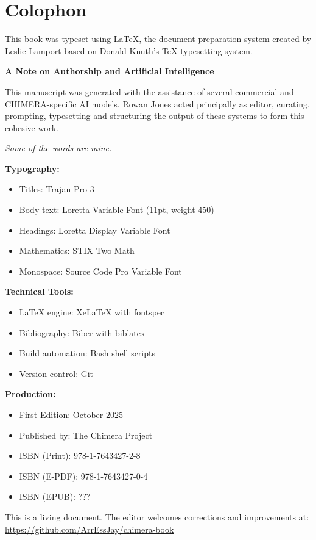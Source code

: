 
\chapter*{Colophon}

This book was typeset using \LaTeX{}, the document preparation system created by Leslie Lamport based on Donald Knuth's \TeX{} typesetting system.

\vspace{0.8cm}

\textbf{A Note on Authorship and Artificial Intelligence}

\vspace{0.3cm}

This manuscript was generated with the assistance of several commercial and CHIMERA-specific AI models. Rowan Jones acted principally as editor, curating, prompting, typesetting and structuring the output of these systems to form this cohesive work.

\vspace{0.3cm}

\textit{Some of the words are mine.}

\vspace{0.8cm}

\textbf{Typography:}
\begin{itemize}
\item Titles: Trajan Pro 3
\item Body text: Loretta Variable Font (11pt, weight 450)
\item Headings: Loretta Display Variable Font
\item Mathematics: STIX Two Math
\item Monospace: Source Code Pro Variable Font
\end{itemize}

\textbf{Technical Tools:}
\begin{itemize}
\item \LaTeX{} engine: Xe\LaTeX{} with fontspec
\item Bibliography: Biber with biblatex
\item Build automation: Bash shell scripts
\item Version control: Git
\end{itemize}

\textbf{Production:}
\begin{itemize}
\item First Edition: October 2025
\item Published by: The Chimera Project
\item ISBN (Print): 978-1-7643427-2-8
\item ISBN (E-PDF): 978-1-7643427-0-4
\item ISBN (EPUB): ???
\end{itemize}

\vspace{0.5cm}

This is a living document. The editor welcomes corrections and improvements at:\\
\url{https://github.com/ArrEssJay/chimera-book}
